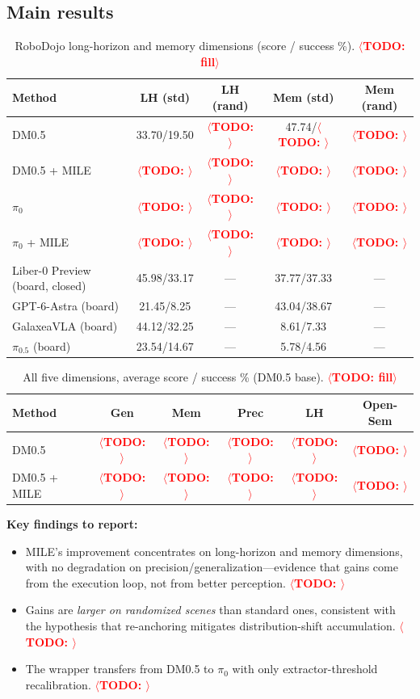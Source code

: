 \documentclass{article}
\newcommand{\mile}{\textsc{MILE}}
\newcommand{\TODO}[1]{\textcolor{red}{\textbf{$\langle$TODO: #1$\rangle$}}}
\begin{document}
\subsection{Main results}

\begin{table}[t]
\centering
\caption{RoboDojo long-horizon and memory dimensions (score / success \%). \TODO{fill}}
\label{tab:main}
\small
\begin{tabular}{lcccc}
\toprule
Method & LH (std) & LH (rand) & Mem (std) & Mem (rand) \\
\midrule
DM0.5                & 33.70/19.50 & \TODO{} & 47.74/\TODO{} & \TODO{} \\
DM0.5 + \mile{}      & \TODO{} & \TODO{} & \TODO{} & \TODO{} \\
$\pi_0$              & \TODO{} & \TODO{} & \TODO{} & \TODO{} \\
$\pi_0$ + \mile{}    & \TODO{} & \TODO{} & \TODO{} & \TODO{} \\
\midrule
Liber-0 Preview (board, closed) & 45.98/33.17 & --- & 37.77/37.33 & --- \\
GPT-6-Astra (board)  & 21.45/8.25 & --- & 43.04/38.67 & --- \\
GalaxeaVLA (board)   & 44.12/32.25 & --- & 8.61/7.33 & --- \\
$\pi_{0.5}$ (board)  & 23.54/14.67 & --- & 5.78/4.56 & --- \\
\bottomrule
\end{tabular}
\end{table}

\begin{table}[t]
\centering
\caption{All five dimensions, average score / success \% (DM0.5 base). \TODO{fill}}
\label{tab:alldim}
\small
\begin{tabular}{lccccc}
\toprule
Method & Gen & Mem & Prec & LH & Open-Sem \\
\midrule
DM0.5           & \TODO{} & \TODO{} & \TODO{} & \TODO{} & \TODO{} \\
DM0.5 + \mile{} & \TODO{} & \TODO{} & \TODO{} & \TODO{} & \TODO{} \\
\bottomrule
\end{tabular}
\end{table}

\noindent\textbf{Key findings to report:}
\begin{itemize}[leftmargin=1.5em,itemsep=1pt]
  \item \mile{}'s improvement concentrates on long-horizon and memory dimensions, with no degradation on precision/generalization---evidence that gains come from the execution loop, not from better perception. \TODO{}
  \item Gains are \emph{larger on randomized scenes} than standard ones, consistent with the hypothesis that re-anchoring mitigates distribution-shift accumulation. \TODO{}
  \item The wrapper transfers from DM0.5 to $\pi_0$ with only extractor-threshold recalibration. \TODO{}
\end{itemize}
\end{document}
